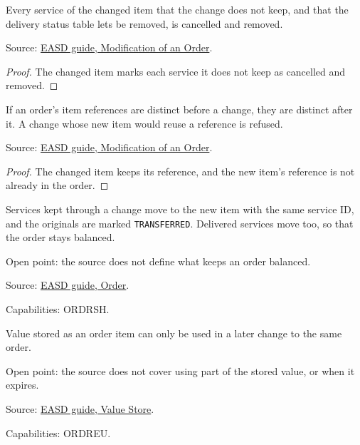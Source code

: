 \begin{theorem}
  \label{thm:change-cancellation-others-cancelled}
  Every service of the changed item that the change does not keep, and that
  the delivery status table lets be removed, is cancelled and removed.

  Source: \href{https://standards.atlassian.net/wiki/spaces/EASD/pages/574619782/Modification+of+an+Order}{EASD guide, Modification of an Order}.
\end{theorem}
\begin{proof}
  The changed item marks each service it does not keep as cancelled and
  removed.
\end{proof}

\begin{theorem}
  \label{thm:change-cancellation-refs-distinct}
  If an order's item references are distinct before a change, they are
  distinct after it.  A change whose new item would reuse a reference is
  refused.

  Source: \href{https://standards.atlassian.net/wiki/spaces/EASD/pages/574619782/Modification+of+an+Order}{EASD guide, Modification of an Order}.
\end{theorem}
\begin{proof}
  The changed item keeps its reference, and the new item's reference is not
  already in the order.
\end{proof}

\begin{theorem}
  \label{thm:c19-transfer-balanced}
  \notready
  Services kept through a change move to the new item with the same service
  ID, and the originals are marked \texttt{TRANSFERRED}.  Delivered services
  move too, so that the order stays balanced.

  Open point: the source does not define what keeps an order balanced.

  Source: \href{https://standards.atlassian.net/wiki/spaces/EASD/pages/574849062/Order}{EASD guide, Order}.

  Capabilities: ORDRSH.
\end{theorem}

\begin{theorem}
  \label{thm:c20-value-store}
  \notready
  Value stored as an order item can only be used in a later change to the same
  order.

  Open point: the source does not cover using part of the stored value, or
  when it expires.

  Source: \href{https://standards.atlassian.net/wiki/spaces/EASD/pages/574554245/Value+Store}{EASD guide, Value Store}.

  Capabilities: ORDREU.
\end{theorem}

